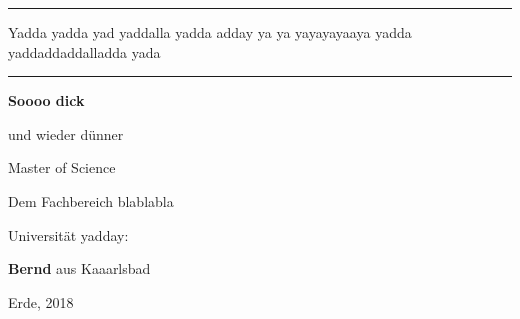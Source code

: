 \begin{titlepage}
	\begin{center}
		\vspace*{0.09\textheight}
		\hrule \vspace{0.6cm}
		{\Huge\bfseries\begin{spacing}{1.1} Yadda yadda yad yaddalla yadda adday ya ya yayayayaaya  yadda yaddaddaddalladda yada \end{spacing}}                                                                                 
		\vspace{0.6cm}\hrule\vspace{0.145\textheight}
		\Large \textbf{Soooo dick}
		
		\vspace*{0.3cm}und wieder dünner
		
		Master of Science
		
		\vspace{0.115\textheight}
		Dem Fachbereich blablabla
		
		Universität yadday:
		
		\vspace*{0.3cm}\textbf{Bernd} aus Kaaarlsbad
		
		\vspace{\fill}
		Erde, 2018
	\end{center}
\end{titlepage}
